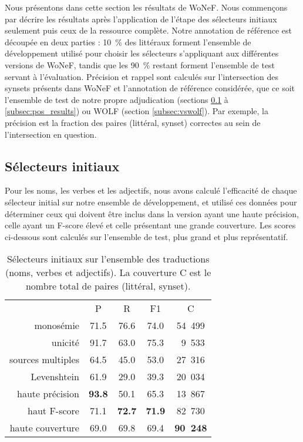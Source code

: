 Nous présentons dans cette section les résultats de WoNeF. Nous commençons par
décrire les résultats après l'application de l'étape des sélecteurs initiaux
seulement puis ceux de la ressource complète. Notre annotation de référence est
découpée en deux parties : 10~\% des littéraux forment l'ensemble de
développement utilisé pour choisir les sélecteurs s'appliquant aux différentes
versions de WoNeF, tandis que les 90~\% restant forment l'ensemble de test
servant à l'évaluation. Précision et rappel sont calculés sur l'intersection
des synsets présents dans WoNeF et l'annotation de référence considérée, que ce
soit l'ensemble de test de notre propre adjudication (sections
\ref{subsec:heuristics} à \ref{subsec:pos_results}) ou WOLF (section
\ref{subsec:vswolf}). Par exemple, la précision est la fraction des paires
(littéral, synset) correctes au sein de l'intersection en question.

\subsection{Sélecteurs initiaux}
\label{subsec:heuristics}

Pour les noms, les verbes et les adjectifs, nous avons calculé l'efficacité de
chaque sélecteur initial sur notre ensemble de développement, et utilisé ces
données pour déterminer ceux qui doivent être inclus dans la version ayant une
haute précision, celle ayant un F-score élevé et celle présentant une grande
couverture. Les scores ci-dessous sont calculés sur l'ensemble de test, plus
grand et plus représentatif.

\let\b\textbf

\begin{table}[ht]
\centering
\begin{tabular}{rcccc}
  \toprule
                    & P & R & F1 & C \\
  monosémie         & 71.5 & 76.6 & 74.0 & 54~499 \\
  unicité           & 91.7 & 63.0 & 75.3 & ~9~533 \\
  sources multiples & 64.5 & 45.0 & 53.0 & 27~316 \\
  Levenshtein       & 61.9 & 29.0 & 39.3 & 20~034 \\
  \midrule
  haute précision   & \b{93.8} & 50.1     & 65.3     & 13~867 \\
  haut F-score      & 71.1     & \b{72.7} & \b{71.9} & 82~730 \\
  haute couverture  & 69.0     & 69.8     & 69.4     & \b{90~248} \\
  \bottomrule
\end{tabular}
\caption{\label{table:heuristics}Sélecteurs initiaux sur l'ensemble des traductions (noms, verbes et adjectifs). La couverture C est le nombre total de paires (littéral, synset).}
\end{table}


